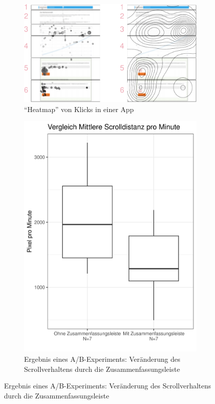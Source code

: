 \documentclass[a0,portrait]{a0poster}
\begin{document}
\begin{multicols}{2}
\begin{figure}[H]
\hfill
\begin{subfigure}[h]{0.6\linewidth}
\includegraphics[width=\linewidth]{figtraj-1}
\caption*{\footnotesize \enquote{Heatmap} von Klicks in einer App}
\end{subfigure}
\hfill
\begin{subfigure}[h]{0.325\linewidth}
\includegraphics[width=\linewidth]{summarypanel_scrolldist_poster}
\caption*{\footnotesize Ergebnis eines A/B-Experiments: Ver\-änd\-erung des Scrollverhaltens durch die Zusammenfassungsleiste}
\end{subfigure}
\hfill
\end{figure}


\end{multicols}
\end{document}
